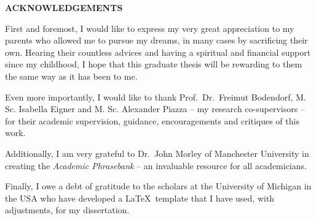 \begin{center}
{\large\bf ACKNOWLEDGEMENTS}
\end{center}

First and foremost, I would like to express my very great appreciation to my parents who allowed me to pursue my dreams, in many cases by sacrificing their own.
Hearing their countless advices and having a spiritual and financial support since my childhood, I hope that this graduate thesis will be rewarding to them the same way as it has been to me. 

Even more importantly, I would like to thank Prof.\ Dr.\ Freimut Bodendorf, M. Sc. Isabella Eigner and M. Sc. Alexander Piazza -- my research co-supervisors -- for their academic supervision, guidance, encouragements and critiques of this work.

Additionally, I am very grateful to Dr.\ John Morley of Manchester University in creating the \emph{Academic Phrasebank} -- an invaluable resource for all academicians.

Finally, I owe a debt of gratitude to the scholars at the University of Michigan in the USA who have developed a \LaTeX\ template that I have used, with adjustments, for my dissertation.
